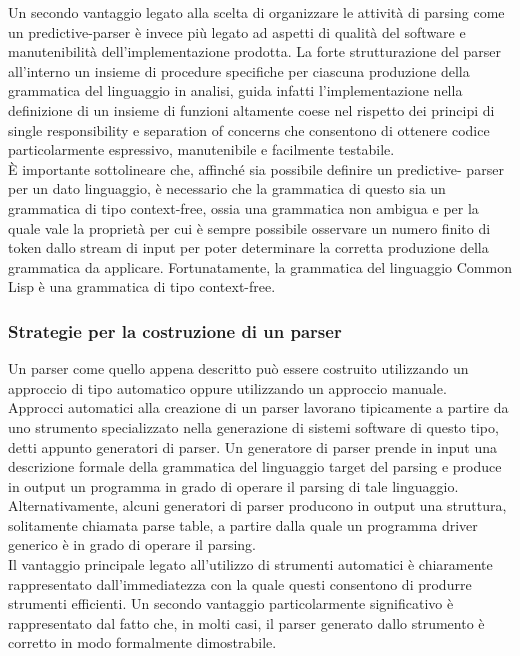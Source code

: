 Un secondo vantaggio legato alla scelta di organizzare le attività di parsing
come un predictive-parser è invece più legato ad aspetti di qualità del software
e manutenibilità dell’implementazione prodotta. La forte strutturazione del
parser all'interno un insieme di procedure specifiche per ciascuna produzione
della grammatica del linguaggio in analisi, guida infatti l’implementazione
nella definizione di un insieme di funzioni altamente coese nel rispetto dei
principi di single responsibility e separation of concerns che consentono di
ottenere codice particolarmente espressivo, manutenibile e facilmente
testabile.\\

È importante sottolineare che, affinché sia possibile definire un predictive-
parser per un dato linguaggio, è necessario che la grammatica di questo sia un
grammatica di tipo context-free, ossia una grammatica non ambigua e per la quale
vale la proprietà per cui è sempre possibile osservare un numero finito di token
dallo stream di input per poter determinare la corretta produzione della
grammatica da applicare. Fortunatamente, la grammatica del linguaggio Common
Lisp è una grammatica di tipo context-free.

\subsubsection{Strategie per la costruzione di un parser}

Un parser come quello appena descritto può essere costruito utilizzando un
approccio di tipo automatico oppure utilizzando un approccio manuale.\\

Approcci automatici alla creazione di un parser lavorano tipicamente a partire
da uno strumento specializzato nella generazione di sistemi software di questo
tipo, detti appunto generatori di parser. Un generatore di parser prende in
input una descrizione formale della grammatica del linguaggio target del parsing
e produce in output un programma in grado di operare il parsing di tale
linguaggio. Alternativamente, alcuni generatori di parser producono in output
una struttura, solitamente chiamata parse table, a partire dalla quale un
programma driver generico è in grado di operare il parsing.\\

Il vantaggio principale legato all'utilizzo di strumenti automatici è
chiaramente rappresentato dall’immediatezza con la quale questi consentono di
produrre strumenti efficienti. Un secondo vantaggio particolarmente
significativo è rappresentato dal fatto che, in molti casi, il parser generato
dallo strumento è corretto in modo formalmente dimostrabile.

